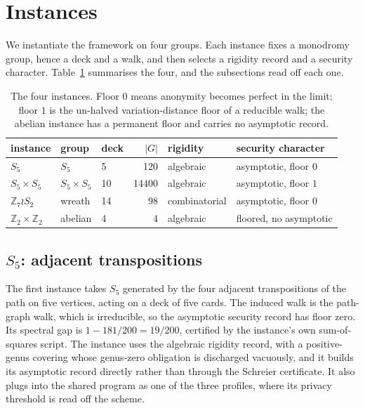 \documentclass[a4paper,11pt]{article}
\begin{document}
\section{Instances}
\label{sec:inst}

We instantiate the framework on four groups. Each instance fixes a monodromy
group, hence a deck and a walk, and then selects a rigidity record and a security
character. Table~\ref{tab:inst} summarises the four, and the subsections read off
each one.

\begin{table}[h]
\centering
\small
\begin{tabular}{@{}lllrll@{}}
\toprule
instance & group & deck & $|G|$ & rigidity & security character \\
\midrule
$S_5$ & $S_5$ & 5 & 120 & algebraic & asymptotic, floor $0$ \\
$S_5\times S_5$ & $S_5\times S_5$ & 10 & 14400 & algebraic & asymptotic, floor $1$ \\
$\mathbb{Z}_7\wr S_2$ & wreath & 14 & 98 & combinatorial & asymptotic, floor $0$ \\
$\mathbb{Z}_2\times\mathbb{Z}_2$ & abelian & 4 & 4 & algebraic & floored, no asymptotic \\
\bottomrule
\end{tabular}
\caption{The four instances. Floor $0$ means anonymity becomes perfect in the
limit; floor $1$ is the un-halved variation-distance floor of a reducible walk;
the abelian instance has a permanent floor and carries no asymptotic record.}
\label{tab:inst}
\end{table}

\subsection{$S_5$: adjacent transpositions}

The first instance takes $S_5$ generated by the four adjacent transpositions of
the path on five vertices, acting on a deck of five cards. The induced walk is
the path-graph walk, which is irreducible, so the asymptotic security record has
floor zero. Its spectral gap is $1 - 181/200 = 19/200$, certified by the
instance's own sum-of-squares script. The instance uses the algebraic rigidity
record, with a positive-genus covering whose genus-zero obligation is discharged
vacuously, and it builds its asymptotic record directly rather than through the
Schreier certificate. It also plugs into the shared program as one of the three
profiles, where its privacy threshold is read off the scheme.
\end{document}
